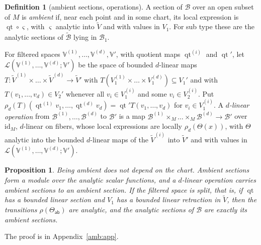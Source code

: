 \documentclass[11pt]{amsart}
\newtheorem{proposition}[theorem]{Proposition}
\theoremstyle{definition}
\newtheorem{definition}[theorem]{Definition}
\theoremstyle{remark}
\numberwithin{equation}{section}
\newcommand{\cL}{\mathcal L}
\newcommand{\id}{\mathrm{id}}
\theoremstyle{plain}
\theoremstyle{definition}
\theoremstyle{plain}
\begin{document}
\begin{definition}[ambient sections, operations]\label{amb:def:section}
A section of $\mathcal B$ over an open subset of $M$ is \emph{ambient} if, near each point and in some chart, its local expression is $\operatorname{qt}\circ\varsigma$, with $\varsigma$ analytic into $\tilde V$ and with values in $V_1$. For sub type these are the analytic sections of $\widetilde{\mathcal B}$ lying in $\mathcal B_1$.

For filtered spaces $\mathbb V^{(1)},\dots,\mathbb V^{(d)},\mathbb V'$, with quotient maps $\operatorname{qt}^{(i)}$ and $\operatorname{qt}'$, let $\cL(\mathbb V^{(1)},\dots,\mathbb V^{(d)};\mathbb V')$ be the space of bounded $d$-linear maps $T\colon\tilde V^{(1)}\times\dots\times\tilde V^{(d)}\to\tilde V'$ with $T(V^{(1)}_1\times\dots\times V^{(d)}_1)\subseteq V_1'$ and with $T(v_1,\dots,v_d)\in V_2'$ whenever all $v_i\in V^{(i)}_1$ and some $v_i\in V^{(i)}_2$. Put $\rho_d(T)(\operatorname{qt}^{(1)}v_1,\dots,\operatorname{qt}^{(d)}v_d)=\operatorname{qt}'T(v_1,\dots,v_d)$ for $v_i\in V^{(i)}_1$. A \emph{$d$-linear operation} from $\mathcal B^{(1)},\dots,\mathcal B^{(d)}$ to $\mathcal B'$ is a map $\mathcal B^{(1)}\times_M\dots\times_M\mathcal B^{(d)}\to\mathcal B'$ over $\id_M$, $d$-linear on fibers, whose local expressions are locally $\rho_d(\Theta(x))$, with $\Theta$ analytic into the bounded $d$-linear maps of the $\tilde V^{(i)}$ into $\tilde V'$ and with values in $\cL(\mathbb V^{(1)},\dots,\mathbb V^{(d)};\mathbb V')$.
\end{definition}

\begin{proposition}\label{amb:prop:sections}
Being ambient does not depend on the chart. Ambient sections form a module over the analytic scalar functions, and a $d$-linear operation carries ambient sections to an ambient section. If the filtered space is split, that is, if $\operatorname{qt}$ has a bounded linear section and $V_1$ has a bounded linear retraction in $\tilde V$, then the transitions $\rho(\Theta_{\mathsf{ab}})$ are analytic, and the analytic sections of $\mathcal B$ are exactly its ambient sections.
\end{proposition}

The proof is in Appendix~\ref{amb:app}.
\end{document}
